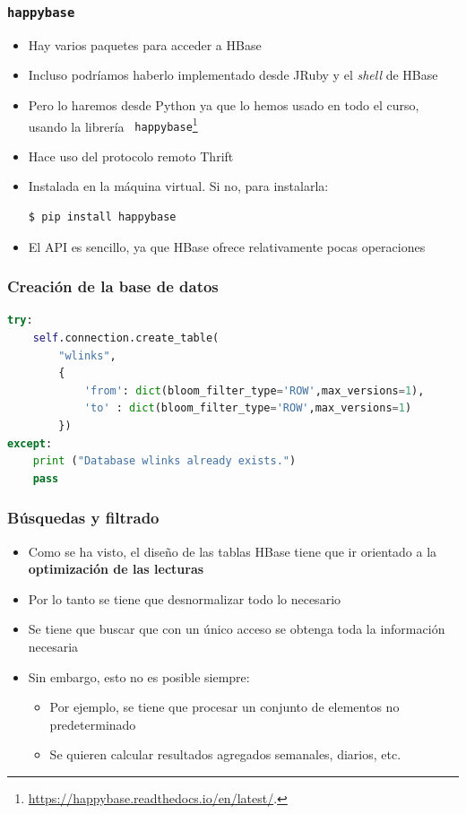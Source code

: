 \documentclass[14pt]{beamer}
\begin{document}
\begin{frame}[fragile]
  \frametitle{{\tt happybase}}
  \begin{itemize}
\item Hay varios paquetes para acceder a HBase
\item Incluso podríamos haberlo implementado desde JRuby y el {\em shell\/}
  de HBase
\item Pero lo haremos desde Python ya que lo hemos usado en todo el curso,
  usando la librería {\tt
    happybase}\footnote{\url{https://happybase.readthedocs.io/en/latest/}.}
\item Hace uso del protocolo remoto Thrift
\item Instalada en la máquina virtual. Si no, para instalarla:
\begin{lstlisting}[language=bash]
$ pip install happybase
\end{lstlisting}
\item El API es sencillo, ya que HBase ofrece relativamente pocas
  operaciones
\end{itemize}
\end{frame}

\begin{frame}[fragile]
  \frametitle{Creación de la base de datos}
\begin{lstlisting}[language=python]
try:
    self.connection.create_table(
        "wlinks",
        {
            'from': dict(bloom_filter_type='ROW',max_versions=1),
            'to' : dict(bloom_filter_type='ROW',max_versions=1)
        })
except:
    print ("Database wlinks already exists.")
    pass
\end{lstlisting}
\end{frame}

\begin{frame}
  \frametitle{Búsquedas y filtrado}
\begin{itemize}
\item Como se ha visto, el diseño de las tablas HBase tiene que ir
  orientado a la {\bf optimización de las lecturas}
\item Por lo tanto se tiene que desnormalizar todo lo necesario
\item Se tiene que buscar que con un único acceso se obtenga toda la
  información necesaria
\item Sin embargo, esto no es posible siempre:
  \begin{itemize}
  \item Por ejemplo, se tiene que procesar un conjunto de elementos no
    predeterminado
  \item Se quieren calcular resultados agregados semanales, diarios, etc.
  \end{itemize}
\end{itemize}
\end{frame}
\end{document}
